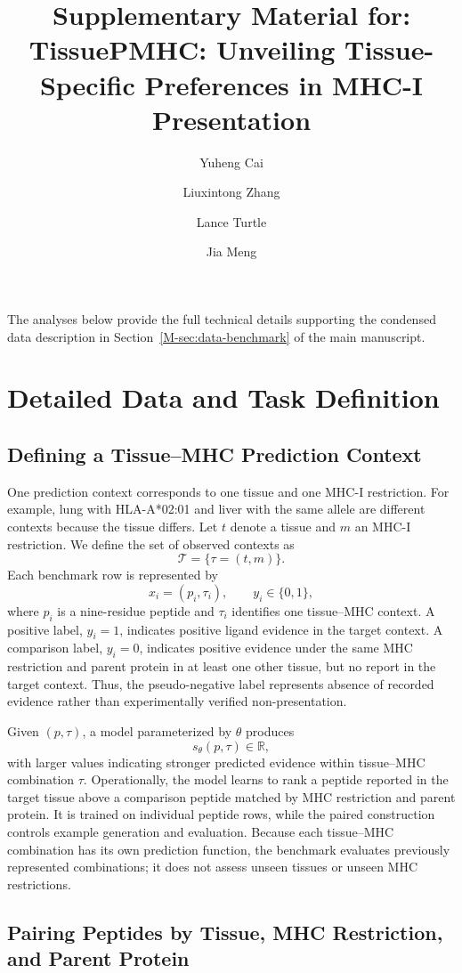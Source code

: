\documentclass[webpdf,modern,large,nocrop,noinfo]{oup-authoring-template}
\title[TissuePMHC Supplement]{Supplementary Material for: TissuePMHC: Unveiling Tissue-Specific Preferences in MHC-I Presentation}
\author[1,2,3,\textdagger]{Yuheng Cai}
\author[1,\textdagger]{Liuxintong Zhang}
\author[2]{Lance Turtle}
\author[1,*]{Jia Meng}
\newcommand{\plainMHCI}{MHC-I}
\begin{document}
\maketitle

The analyses below provide the full technical details supporting the condensed data description in Section~\ref{M-sec:data-benchmark} of the main manuscript.

\section{Detailed Data and Task Definition}
\label{sec:supp-data-task}

\subsection{Defining a Tissue--MHC Prediction Context}

One prediction context corresponds to one tissue and one \plainMHCI{} restriction. For example, lung with HLA-A*02:01 and liver with the same allele are different contexts because the tissue differs. Let \(t\) denote a tissue and \(m\) an MHC-I restriction. We define the set of observed contexts as
\[
\mathcal{T}=\{\tau=(t,m)\}.
\]
Each benchmark row is represented by
\[
x_i=(p_i,\tau_i), \qquad y_i\in\{0,1\},
\]
where \(p_i\) is a nine-residue peptide and \(\tau_i\) identifies one tissue--MHC context. A positive label, \(y_i=1\), indicates positive ligand evidence in the target context. A comparison label, \(y_i=0\), indicates positive evidence under the same MHC restriction and parent protein in at least one other tissue, but no report in the target context. Thus, the pseudo-negative label represents absence of recorded evidence rather than experimentally verified non-presentation.

Given \((p,\tau)\), a model parameterized by \(\theta\) produces
\[
s_{\theta}(p,\tau)\in\mathbb{R},
\]
with larger values indicating stronger predicted evidence within tissue--MHC combination \(\tau\). Operationally, the model learns to rank a peptide reported in the target tissue above a comparison peptide matched by MHC restriction and parent protein. It is trained on individual peptide rows, while the paired construction controls example generation and evaluation. Because each tissue--MHC combination has its own prediction function, the benchmark evaluates previously represented combinations; it does not assess unseen tissues or unseen MHC restrictions.

\subsection{Pairing Peptides by Tissue, MHC Restriction, and Parent Protein}
\end{document}
